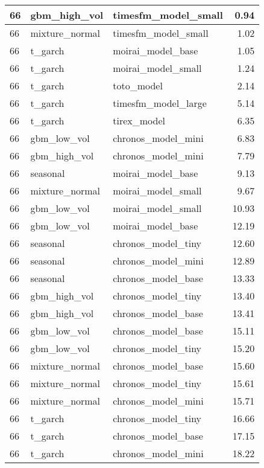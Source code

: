 {\begin{tabular}{lllr}
66 & gbm\_high\_vol & timesfm\_model\_small & 0.94 \\
\midrule
66 & mixture\_normal & timesfm\_model\_small & 1.02 \\
\midrule
66 & t\_garch & moirai\_model\_base & 1.05 \\
\midrule
66 & t\_garch & moirai\_model\_small & 1.24 \\
\midrule
66 & t\_garch & toto\_model & 2.14 \\
\midrule
66 & t\_garch & timesfm\_model\_large & 5.14 \\
\midrule
66 & t\_garch & tirex\_model & 6.35 \\
\midrule
66 & gbm\_low\_vol & chronos\_model\_mini & 6.83 \\
\midrule
66 & gbm\_high\_vol & chronos\_model\_mini & 7.79 \\
\midrule
66 & seasonal & moirai\_model\_base & 9.13 \\
\midrule
66 & mixture\_normal & moirai\_model\_small & 9.67 \\
\midrule
66 & gbm\_low\_vol & moirai\_model\_small & 10.93 \\
\midrule
66 & gbm\_low\_vol & moirai\_model\_base & 12.19 \\
\midrule
66 & seasonal & chronos\_model\_tiny & 12.60 \\
\midrule
66 & seasonal & chronos\_model\_mini & 12.89 \\
\midrule
66 & seasonal & chronos\_model\_base & 13.33 \\
\midrule
66 & gbm\_high\_vol & chronos\_model\_tiny & 13.40 \\
\midrule
66 & gbm\_high\_vol & chronos\_model\_base & 13.41 \\
\midrule
66 & gbm\_low\_vol & chronos\_model\_base & 15.11 \\
\midrule
66 & gbm\_low\_vol & chronos\_model\_tiny & 15.20 \\
\midrule
66 & mixture\_normal & chronos\_model\_base & 15.60 \\
\midrule
66 & mixture\_normal & chronos\_model\_tiny & 15.61 \\
\midrule
66 & mixture\_normal & chronos\_model\_mini & 15.71 \\
\midrule
66 & t\_garch & chronos\_model\_tiny & 16.66 \\
\midrule
66 & t\_garch & chronos\_model\_base & 17.15 \\
\midrule
66 & t\_garch & chronos\_model\_mini & 18.22 \\
\bottomrule
\end{tabular}
}